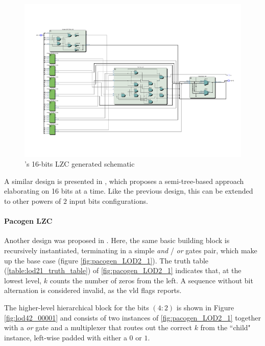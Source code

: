 \begin{figure}
    \centering
    \includegraphics[width=\textwidth]{figures/milenkovic_quartus2.pdf}
    \caption{\cite{milenkovic_modular_2015}'s 16-bits LZC generated schematic}
    \label{fig:milenkovic_lzc_quartus}
\end{figure}


A similar design is presented in \cite{dimitrakopoulos_low-power_2008}, which proposes a semi-tree-based approach elaborating on 16 bits at a time. Like the previous design, this can be extended to other powers of $2$ input bits configurations.

\paragraph{Pacogen LZC}

Another design was proposed in \cite{PACoGen}.
Here, the same basic building block is recursively instantiated, terminating in a simple \textit{and} / \textit{or} gates pair, which make up the base case (figure \ref{fig:pacogen_LOD2_1}).
The truth table (\ref{table:lod21_truth_table}) of \ref{fig:pacogen_LOD2_1} indicates that, at the lowest level, $k$ counts the number of zeros from the left. A sequence without bit alternation is considered invalid, as the $\text{vld}$ flags reports.

The higher-level hierarchical block for the bits $(4:2)$ is shown in Figure \ref{fig:lod42_00001} and consists of two instances of \ref{fig:pacogen_LOD2_1} together with a \textit{or} gate and a multiplexer that routes out the correct $k$ from the ``child" instance, left-wise padded with either a $0$ or $1$.


